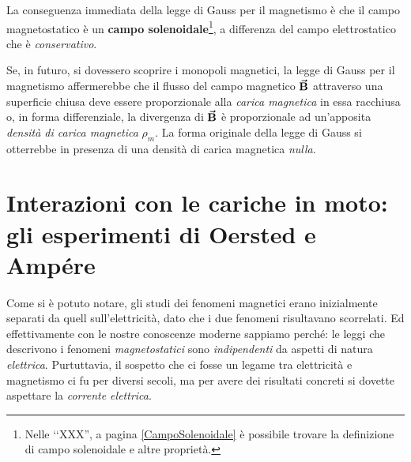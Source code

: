 La conseguenza immediata della legge di Gauss per il magnetismo è che il campo magnetostatico è un \textbf{campo solenoidale}\footnote{Nelle ‘‘XXX'', a pagina \ref{CampoSolenoidale} è possibile trovare la definizione di campo solenoidale e altre proprietà.}, a differenza del campo elettrostatico che è \textit{conservativo}.
\begin{digression}
	Se, in futuro, si dovessero scoprire i monopoli magnetici, la legge di Gauss per il magnetismo affermerebbe che il flusso del campo magnetico $\vb*{\va{B}}$ attraverso una superficie chiusa deve essere proporzionale alla \textit{carica magnetica} in essa racchiusa o, in forma differenziale, la divergenza di $\vb*{\va{B}}$ è proporzionale ad un'apposita \textit{densità di carica magnetica} $\rho_m$. La forma originale della legge di Gauss si otterrebbe in presenza di una densità di carica magnetica \textit{nulla}.
\end{digression}
\section{Interazioni con le cariche in moto: gli esperimenti di Oersted e Ampére}
Come si è potuto notare, gli studi dei fenomeni magnetici erano inizialmente separati da quell sull'elettricità, dato che i due fenomeni risultavano scorrelati. Ed effettivamente con le nostre conoscenze moderne sappiamo perché: le leggi che descrivono i fenomeni \textit{magnetostatici} sono \textit{indipendenti} da aspetti di natura \textit{elettrica}. Purtuttavia, il sospetto che ci fosse un legame tra elettricità e magnetismo ci fu per diversi secoli, ma per avere dei risultati concreti si dovette aspettare la \textit{corrente elettrica}.
